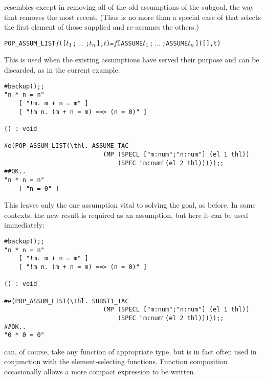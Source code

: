 {\noindent {}
resembles  except in removing
all of the old assumptions of the subgoal, the way that 
removes the most recent.  (Thus  is no more than a special case
of  that selects the first element of those supplied
and re-assumes the others.)

\begin{hol}\begin{alltt}
   POP_ASSUM_LIST \(f\) ([\(t\sb{1}\);\(\ \ldots\ \);\(t\sb{n}\)],\(t\)) =  \(f\) [ASSUME \(t\sb{1}\);\(\ \ldots\ \);ASSUME \(t\sb{n}\)] ([],t)
\end{alltt}\end{hol}

\noindent This is used when the existing assumptions have served
their purpose and can be discarded, as in the current example:

\begin{session}\begin{verbatim}
#backup();;
"n * n = n"
    [ "!m. m + n = m" ]
    [ "!m n. (m + n = m) ==> (n = 0)" ]

() : void

#e(POP_ASSUM_LIST(\thl. ASSUME_TAC
                           (MP (SPECL ["m:num";"n:num"] (el 1 thl)) 
                               (SPEC "m:num"(el 2 thl)))));;
##OK..
"n * n = n"
    [ "n = 0" ]
\end{verbatim}\end{session}

\noindent This leaves only the one assumption vital to solving the goal,
as before. In some contexts, the new result is required as an assumption,
but here it can be used immediately:

\begin{session}\begin{verbatim}
#backup();;
"n * n = n"
    [ "!m. m + n = m" ]
    [ "!m n. (m + n = m) ==> (n = 0)" ]

() : void

#e(POP_ASSUM_LIST(\thl. SUBST1_TAC
                           (MP (SPECL ["m:num";"n:num"] (el 1 thl)) 
                               (SPEC "m:num"(el 2 thl)))));;
##OK..
"0 * 0 = 0"
\end{verbatim}\end{session}

\noindent {} can, of course, 
take any function of appropriate
type, but is in fact often used in conjunction with the element-selecting
functions. Function composition occasionally allows a more
compact expression to be written.

}
